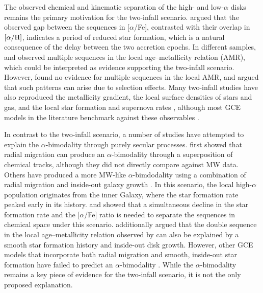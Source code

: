\documentclass[twocolumn,twocolappendix,linenumbers]{aastex631}
\newcommand{\todo}[1]{{\color{red}#1}}
\newcommand{\aFe}{[$\alpha$/Fe]\xspace}
\begin{document}
The observed chemical and kinematic separation of the high- and low-$\alpha$ disks remains the primary motivation for the two-infall scenario. \citet{spitoni_remind_2024} argued that the observed gap between the sequences in \aFe, contrasted with their overlap in $[\alpha/{\rm H}]$, indicates a period of reduced star formation, which is a natural consequence of the delay between the two accretion epochs. In different samples, \citet{nissen_high-precision_2020} and \citet{nataf_accurate_2024} observed multiple sequences in the local age--metallicity relation (AMR), which could be interpreted as evidence supporting the two-infall scenario. However, \citet{plotnikova_chemical_2024} found no evidence for multiple sequences in the local AMR, and argued that such patterns can arise due to selection effects. Many two-infall studies have also reproduced the metallicity gradient, the local surface densities of stars and gas, and the local star formation and supernova rates \citep[e.g.,][]{chiappini_chemical_1997,romano_mass_2000,spitoni_remind_2024}, although most GCE models in the literature benchmark against these observables \citep[e.g.,][]{minchev_chemodynamical_2013,johnson_stellar_2021}.

In contrast to the two-infall scenario, a number of studies have attempted to explain the $\alpha$-bimodality through purely secular processes. 
\citet{schonrich_chemical_2009} first showed that radial migration can produce an $\alpha$-bimodality through a superposition of chemical tracks, although they did not directly compare against MW data. Others have produced a more MW-like $\alpha$-bimdodality using a combination of radial migration and inside-out galaxy growth \citep[e.g.,][]{kubryk_evolution_2015,sharma_chemical_2021,chen_chemical_2023,prantzos_origin_2023}. In this scenario, the local high-$\alpha$ population originates from the inner Galaxy, where the star formation rate peaked early in its history. \citet{sharma_chemical_2021} and \citet{chen_chemical_2023} showed that a simultaneous decline in the star formation rate and the \aFe ratio is needed to separate the sequences in chemical space under this scenario. \citet{chen_recent_2025} additionally argued that the double sequence in the local age--metallicity relation observed by \citet{nissen_high-precision_2020} can also be explained by a smooth star formation history and inside-out disk growth. However, other GCE models that incorporate both radial migration and smooth, inside-out star formation have failed to predict an $\alpha$-bimodality \citep[e.g.,][]{johnson_stellar_2021,dubay_galactic_2024}. While the $\alpha$-bimodality remains a key piece of evidence for the two-infall scenario, it is not the only proposed explanation.
\end{document}
